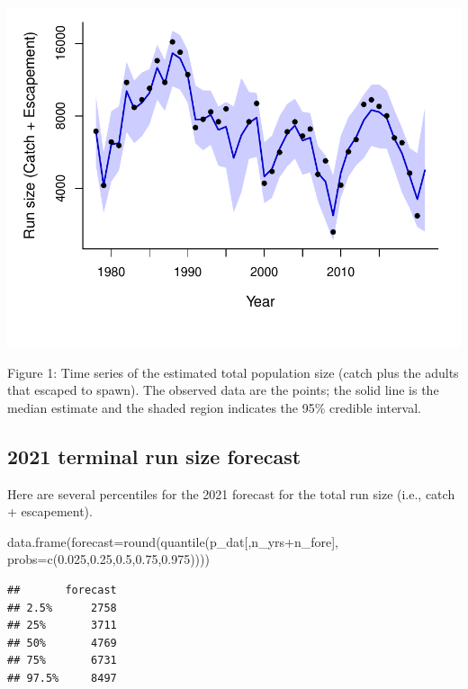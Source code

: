 \documentclass[
  11pt,
]{article}
\newenvironment{Shaded}{}{}
\newcommand{\DataTypeTok}[1]{#1}
\newcommand{\FloatTok}[1]{#1}
\newcommand{\KeywordTok}[1]{\textcolor[rgb]{0.00,0.00,1.00}{#1}}
\newcommand{\NormalTok}[1]{#1}
\newcommand{\OperatorTok}[1]{#1}
\begin{document}
\begin{center}\includegraphics{App_3_Summarize_results_forecast_2020_2021_files/figure-latex/fig_2_run_size-1} \end{center}

Figure 1: Time series of the estimated total population size (catch plus
the adults that escaped to spawn). The observed data are the points; the
solid line is the median estimate and the shaded region indicates the
95\% credible interval.

\hypertarget{terminal-run-size-forecast}{%
\subsection{2021 terminal run size
forecast}\label{terminal-run-size-forecast}}

Here are several percentiles for the 2021 forecast for the total run
size (i.e., catch + escapement).

\begin{Shaded}
\begin{Highlighting}[]
\KeywordTok{data.frame}\NormalTok{(}\DataTypeTok{forecast=}\KeywordTok{round}\NormalTok{(}\KeywordTok{quantile}\NormalTok{(p_dat[,n_yrs}\OperatorTok{+}\NormalTok{n_fore],}
                                   \DataTypeTok{probs=}\KeywordTok{c}\NormalTok{(}\FloatTok{0.025}\NormalTok{,}\FloatTok{0.25}\NormalTok{,}\FloatTok{0.5}\NormalTok{,}\FloatTok{0.75}\NormalTok{,}\FloatTok{0.975}\NormalTok{))))}
\end{Highlighting}
\end{Shaded}

\begin{verbatim}
##       forecast
## 2.5%      2758
## 25%       3711
## 50%       4769
## 75%       6731
## 97.5%     8497
\end{verbatim}
\end{document}
